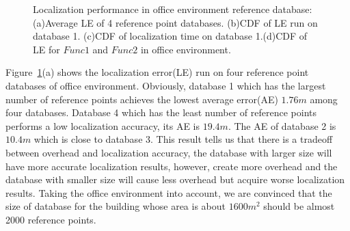 \begin{figure}
\centering
{}
\caption{Localization performance in office environment reference database: (a)Average LE of 4 reference point databases. (b)CDF of LE run on database 1. (c)CDF of localization time on database 1.(d)CDF of LE for $Func1$ and $Func2$ in office environment.}
\label{ref_size}
\end{figure}
Figure~\ref{ref_size}(a) shows the localization error(LE) run on four reference point databases of office environment. Obviously, database 1 which has the largest number of reference points achieves the lowest average error(AE) $1.76m$ among four databases. Database 4 which has the least number of reference points performs a low localization accuracy, its AE is $19.4m$. The AE of database 2 is $10.4m$ which is close to database 3. This result tells us that there is a tradeoff between overhead and localization accuracy, \ie the database with larger size will have more accurate localization results, however, create more overhead and the database with smaller size will cause less overhead but acquire worse localization results. Taking the office environment into account, we are convinced that the size of database for the building whose area is about $1600m^2$ should be almost 2000 reference points.

